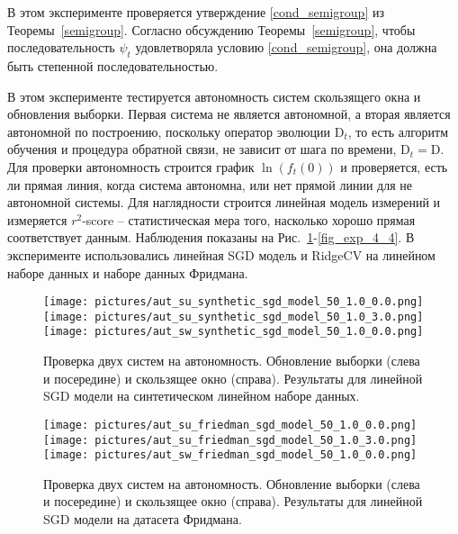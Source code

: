     В этом эксперименте проверяется утверждение \eqref{cond_semigroup} из Теоремы~\ref{semigroup}. Согласно обсуждению Теоремы~\ref{semigroup}, чтобы последовательность $\psi_t$ удовлетворяла условию \eqref{cond_semigroup}, она должна быть степенной последовательностью.

    В этом эксперименте тестируется автономность систем скользящего окна и обновления выборки. Первая система не является автономной, а вторая является автономной по построению, поскольку оператор эволюции $\text{D}_t$, то есть алгоритм обучения и процедура обратной связи, не зависит от шага по времени, $\text{D}_t = \text{D}$.
    Для проверки автономность строится график $\ln(f_t(0))$ и проверяется, есть ли прямая линия, когда система автономна, или нет прямой линии для не автономной системы. Для наглядности строится линейная модель измерений и измеряется $r^2$-score -- статистическая мера того, насколько хорошо прямая соответствует данным. Наблюдения показаны на Рис.~\ref{fig_exp_4_1}-\ref{fig_exp_4_4}. В эксперименте использовались линейная SGD модель и RidgeCV на линейном наборе данных и наборе данных Фридмана.

    \begin{figure}[h!]
        \centering
        \texttt{[image: pictures/aut\_su\_synthetic\_sgd\_model\_50\_1.0\_0.0.png]}
        \texttt{[image: pictures/aut\_su\_synthetic\_sgd\_model\_50\_1.0\_3.0.png]}
        \texttt{[image: pictures/aut\_sw\_synthetic\_sgd\_model\_50\_1.0\_0.0.png]}
        
        \caption{Проверка двух систем на автономность. Обновление выборки (слева и посередине) и скользящее окно (справа). Результаты для линейной SGD модели на синтетическом линейном наборе данных.}
        \label{fig_exp_4_1}
    \end{figure}

    \begin{figure}[h!]
        \centering
        \texttt{[image: pictures/aut\_su\_friedman\_sgd\_model\_50\_1.0\_0.0.png]}
        \texttt{[image: pictures/aut\_su\_friedman\_sgd\_model\_50\_1.0\_3.0.png]}
        \texttt{[image: pictures/aut\_sw\_friedman\_sgd\_model\_50\_1.0\_0.0.png]}
        
        \caption{Проверка двух систем на автономность. Обновление выборки (слева и посередине) и скользящее окно (справа). Результаты для линейной SGD модели на датасета Фридмана.}
        \label{fig_exp_4_2}
    \end{figure}

